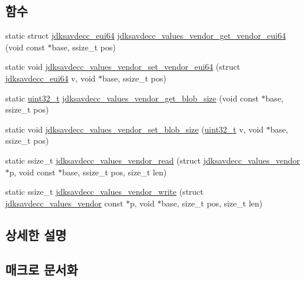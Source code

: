 \subsection*{함수}
\begin{DoxyCompactItemize}
\item 
static struct \hyperlink{structjdksavdecc__eui64}{jdksavdecc\+\_\+eui64} \hyperlink{group__values__vendor_ga7cbde0c8a9c382e4783b5d4c7059958c}{jdksavdecc\+\_\+values\+\_\+vendor\+\_\+get\+\_\+vendor\+\_\+eui64} (void const $\ast$base, ssize\+\_\+t pos)
\item 
static void \hyperlink{group__values__vendor_gaa33a0dbeb2897ccd7159dff3714fad7b}{jdksavdecc\+\_\+values\+\_\+vendor\+\_\+set\+\_\+vendor\+\_\+eui64} (struct \hyperlink{structjdksavdecc__eui64}{jdksavdecc\+\_\+eui64} v, void $\ast$base, ssize\+\_\+t pos)
\item 
static \hyperlink{parse_8c_a6eb1e68cc391dd753bc8ce896dbb8315}{uint32\+\_\+t} \hyperlink{group__values__vendor_ga99e87579e7be48c94965ade13df2cd05}{jdksavdecc\+\_\+values\+\_\+vendor\+\_\+get\+\_\+blob\+\_\+size} (void const $\ast$base, ssize\+\_\+t pos)
\item 
static void \hyperlink{group__values__vendor_ga7447e93f8538b9181832c2f8a89ed1e5}{jdksavdecc\+\_\+values\+\_\+vendor\+\_\+set\+\_\+blob\+\_\+size} (\hyperlink{parse_8c_a6eb1e68cc391dd753bc8ce896dbb8315}{uint32\+\_\+t} v, void $\ast$base, ssize\+\_\+t pos)
\item 
static ssize\+\_\+t \hyperlink{group__values__vendor_ga31f429212ad2e628956cc960e479e0c4}{jdksavdecc\+\_\+values\+\_\+vendor\+\_\+read} (struct \hyperlink{structjdksavdecc__values__vendor}{jdksavdecc\+\_\+values\+\_\+vendor} $\ast$p, void const $\ast$base, ssize\+\_\+t pos, size\+\_\+t len)
\item 
static ssize\+\_\+t \hyperlink{group__values__vendor_ga74487688c015483d3b92772d0b59444c}{jdksavdecc\+\_\+values\+\_\+vendor\+\_\+write} (struct \hyperlink{structjdksavdecc__values__vendor}{jdksavdecc\+\_\+values\+\_\+vendor} const $\ast$p, void $\ast$base, size\+\_\+t pos, size\+\_\+t len)
\end{DoxyCompactItemize}


\subsection{상세한 설명}


\subsection{매크로 문서화}
